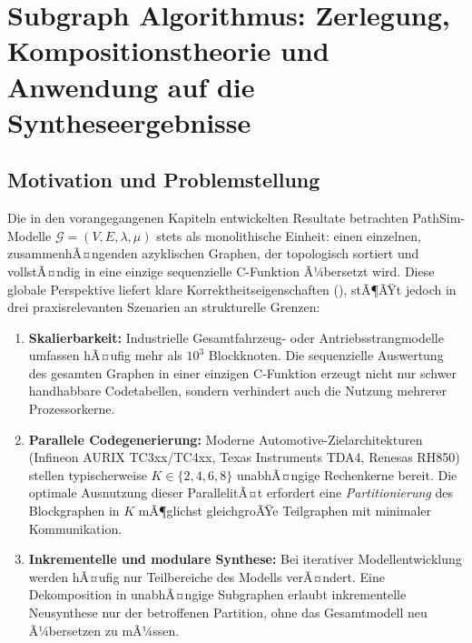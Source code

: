 ﻿\documentclass[12pt,a4paper]{article}
\theoremstyle{definition}
\begin{document}
\section{Subgraph Algorithmus: Zerlegung, Kompositionstheorie und Anwendung auf die Syntheseergebnisse}
\label{sec:subgraph}

\subsection{Motivation und Problemstellung}

Die in den vorangegangenen Kapiteln entwickelten Resultate betrachten
PathSim-Modelle $\mathcal{G} = (V, E, \lambda, \mu)$ stets als monolithische
Einheit: einen einzelnen, zusammenhÃ¤ngenden azyklischen Graphen, der topologisch
sortiert und vollstÃ¤ndig in eine einzige sequenzielle C-Funktion Ã¼bersetzt wird.
Diese globale Perspektive liefert klare Korrektheitseigenschaften
(), stÃ¶ÃŸt jedoch in drei praxisrelevanten
Szenarien an strukturelle Grenzen:

\begin{enumerate}[label=(\roman*)]
  \item \textbf{Skalierbarkeit:} Industrielle Gesamtfahrzeug- oder
        Antriebsstrangmodelle umfassen hÃ¤ufig mehr als $10^3$ Blockknoten.
        Die sequenzielle Auswertung des gesamten Graphen in einer einzigen
        C-Funktion erzeugt nicht nur schwer handhabbare Codetabellen, sondern
        verhindert auch die Nutzung mehrerer Prozessorkerne.

  \item \textbf{Parallele Codegenerierung:} Moderne Automotive-Zielarchitekturen
        (Infineon AURIX TC3xx/TC4xx, Texas Instruments TDA4, Renesas RH850)
        stellen typischerweise $K \in \{2, 4, 6, 8\}$ unabhÃ¤ngige Rechenkerne
        bereit. Die optimale Ausnutzung dieser ParallelitÃ¤t erfordert eine
        \emph{Partitionierung} des Blockgraphen in $K$ mÃ¶glichst gleichgroÃŸe
        Teilgraphen mit minimaler Kommunikation.

  \item \textbf{Inkrementelle und modulare Synthese:} Bei iterativer
        Modellentwicklung werden hÃ¤ufig nur Teilbereiche des Modells verÃ¤ndert.
        Eine Dekomposition in unabhÃ¤ngige Subgraphen erlaubt inkrementelle
        Neusynthese nur der betroffenen Partition, ohne das Gesamtmodell
        neu Ã¼bersetzen zu mÃ¼ssen.
\end{enumerate}
\end{document}
